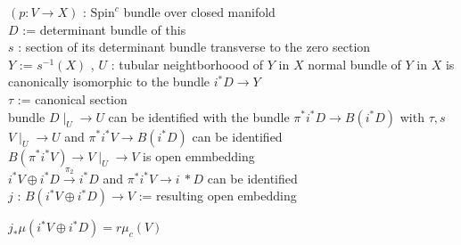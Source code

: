 \begin{Definition}
\itemwhen
  \For \((p : V \to X)\) : \(\text{Spin}^c\) bundle over closed manifold \\
  \Let \(D\) := determinant bundle of this \\
  \For \(s\) : section of its determinant bundle transverse to the zero section \\
  \Let \(Y\) := \(s^{-1}(X)\) , \(U\) : tubular neightborhoood of \(Y\) in \(X\)
\itemprop
  \Then normal bundle of \(Y\) in \(X\) is canonically isomorphic to the bundle \(i^*D \to Y\) \\
  \Define \(\tau\) := canonical section \\
  \Then bundle \(D\mid_U \to U\) can be identified with the bundle \(\pi^*{i^* D} \to B(i^*D)\) with \(\tau , s\)
\itemprop
  \Then \(V \mid_U \to U\) and \(\pi^* {i^* V} \to B(i^*D)\) can be identified \\
  \Then \(B(\pi^*{i^* V}) \to V \mid_U \to V\) is open emmbedding \\
  \Then \(i^*V \oplus i^* D \overset{\pi_2}{\to} i^* D\) and \(\pi^*{i^*V} \to i~* D\) can be identified \\
\itemdefi
  \Define \(j\) : \(B(i^*V \oplus i^* D) \to V\) := resulting open embedding
\end{Definition}

\begin{Theorem}
\itemprop
  \Then \(j_* \mu(i^* V \oplus i^* D) = r \mu_c(V)\)
\end{Theorem}